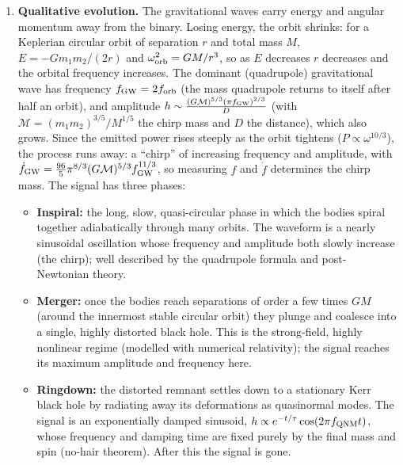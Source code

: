\documentclass[12pt]{article}
\begin{document}
\begin{enumerate}[label=\alph*)]
\item \textbf{Qualitative evolution.} The gravitational waves carry energy and angular momentum away from the binary.
Losing energy, the orbit shrinks: for a Keplerian circular orbit of separation $r$ and total mass $M$, $E = -G m_1 m_2/(2r)$
and $\omega_{\rm orb}^2 = GM/r^3$, so as $E$ decreases $r$ decreases and the orbital frequency increases. The
dominant (quadrupole) gravitational wave has frequency $f_{\rm GW} = 2f_{\rm orb}$ (the mass quadrupole returns to itself
after half an orbit), and amplitude $h\sim \frac{(G\mathcal M)^{5/3}(\pi f_{\rm GW})^{2/3}}{D}$ (with $\mathcal M = (m_1m_2)^{3/5}/M^{1/5}$ the chirp
mass and $D$ the distance), which also grows. Since the emitted power rises steeply as the orbit tightens
($P\propto \omega^{10/3}$), the process runs away: a ``chirp'' of increasing frequency and amplitude, with
$\dot f_{\rm GW} = \frac{96}{5}\pi^{8/3}(G\mathcal M)^{5/3}f_{\rm GW}^{11/3}$, so measuring $f$ and $\dot f$ determines the chirp mass.
The signal has three phases:
\begin{itemize}
\item \textbf{Inspiral:} the long, slow, quasi-circular phase in which the bodies spiral together adiabatically through many
orbits. The waveform is a nearly sinusoidal oscillation whose frequency and amplitude both slowly increase (the chirp);
well described by the quadrupole formula and post-Newtonian theory.
\item \textbf{Merger:} once the bodies reach separations of order a few times $GM$ (around the innermost stable circular
orbit) they plunge and coalesce into a single, highly distorted black hole. This is the strong-field, highly
nonlinear regime (modelled with numerical relativity); the signal reaches its maximum amplitude and frequency here.
\item \textbf{Ringdown:} the distorted remnant settles down to a stationary Kerr black hole by radiating away its
deformations as quasinormal modes. The signal is an exponentially damped sinusoid, $h\propto e^{-t/\tau}\cos(2\pi f_{\rm QNM}t)$,
whose frequency and damping time are fixed purely by the final mass and spin (no-hair theorem). After this the signal
is gone.
\end{itemize}


\end{enumerate}
\end{document}
